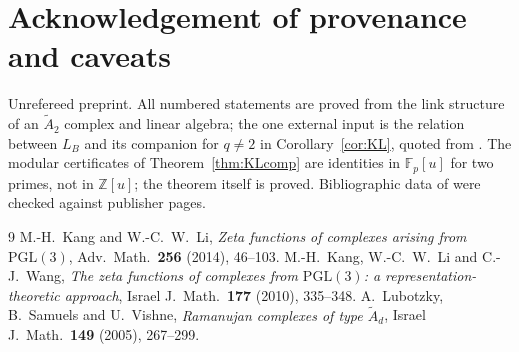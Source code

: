 \documentclass[11pt]{amsart}
\numberwithin{equation}{section}
\theoremstyle{definition}
\theoremstyle{remark}
\newcommand{\Z}{\mathbb{Z}}
\newcommand{\F}{\mathbb{F}}
\newcommand{\LB}{L_B}
\newcommand{\Atwo}{\widetilde A_2}
\begin{document}
\section*{Acknowledgement of provenance and caveats}

Unrefereed preprint. All numbered statements are proved from the link structure of an
$\Atwo$ complex and linear algebra; the one external input is the relation between $\LB$
and its companion for $q\ne2$ in Corollary~\ref{cor:KL}, quoted from \cite{KL}. The
modular certificates of Theorem~\ref{thm:KLcomp} are identities in $\F_p[u]$ for two
primes, not in $\Z[u]$; the theorem itself is proved. Bibliographic data of
\cite{KL,KLW,LSV} were checked against publisher pages.

\begin{thebibliography}{9}
 M.-H.~Kang and W.-C.~W.~Li, \emph{Zeta functions of complexes arising from
$\mathrm{PGL}(3)$}, Adv.\ Math.\ \textbf{256} (2014), 46--103.
 M.-H.~Kang, W.-C.~W.~Li and C.-J.~Wang, \emph{The zeta functions of complexes
from $\mathrm{PGL}(3)$: a representation-theoretic approach}, Israel J.\ Math.\ \textbf{177}
(2010), 335--348.
 A.~Lubotzky, B.~Samuels and U.~Vishne, \emph{Ramanujan complexes of type
$\widetilde A_d$}, Israel J.\ Math.\ \textbf{149} (2005), 267--299.
\end{thebibliography}
\end{document}
